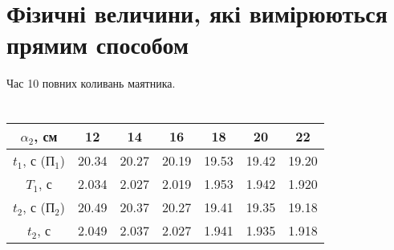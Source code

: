 \documentclass{article}
\begin{document}
{\section*{Фізичні величини, які вимірюються прямим способом}
Час 10 повних коливань маятника.

\bigskip

\section*{}

\renewcommand{\arraystretch}{1.3}
\begin{center}
\begin{tabular}{|c| c| c| c| c| c| c|}
	\hline
	$\alpha_2$, см & 12 & 14 & 16 & 18 & 20 & 22\\
	\hline
	$t_1$, с (П$_1$) & 20.34 & 20.27 & 20.19 & 19.53 & 19.42 & 19.20\\
	\hline
	$T_1$, с & 2.034 & 2.027 & 2.019 & 1.953 & 1.942 & 1.920\\
	\hline
	$t_2$, с (П$_2$) & 20.49 & 20.37 & 20.27 & 19.41 & 19.35 & 19.18\\
	\hline
	$t_2$, с & 2.049 & 2.037 & 2.027 & 1.941 & 1.935 & 1.918\\
	\hline
\end{tabular}

\end{center}
}
\end{document}
